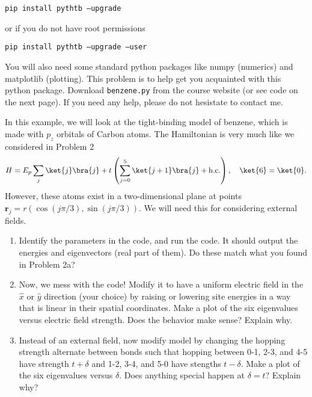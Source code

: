 \documentclass{cthhw}
\begin{document}
\vspace{10pt}
{\tt pip install pythtb --upgrade}
\vspace{10pt}

or if you do not have root permissions

\vspace{10pt}
{\tt pip install pythtb --upgrade --user}
\vspace{10pt}

You will also need some standard python packages like {\sc numpy} (numerics) and {\sc matplotlib} (plotting).
This problem is to help get you acquainted with this python package. Download \texttt{benzene.py} from the course website (or see code on the next page).
If you need any help, please do not hesistate to contact me.

In this example, we will look at the tight-binding model of benzene, which is made with $p_{z}$ orbitals of Carbon atoms. The Hamiltonian is very much like we considered in Problem 2
\begin{equation}
	\label{eq:9}
	H = E_{p} \sum_{j} \ket{j}\bra{j} + t \left(\sum_{j=0}^{5} \ket{j+1} \bra{j} + \mathrm{h.c.}\right), \quad \ket{6} = \ket{0}.
\end{equation}
However, these atoms exist in a two-dimensional plane at points $\mathbf r_{j} = r (\cos(j \pi/3), \sin(j \pi/3)) $. We will need this for considering external fields.

\begin{enumerate}
	\item Identify the parameters in the code, and run the code. It should output the energies and eigenvectors (real part of them). Do these match what you found in Problem 2a?
	\item Now, we mess with the code! Modify it to have a uniform electric field in the $\hat x$ or $\hat y$ direction (your choice) by raising or lowering site energies in a way that is linear in their spatial coordinates. Make a plot of the six eigenvalues versus electric field strength. Does the behavior make sense? Explain why.
	\item Instead of an external field, now modify model by changing the hopping strength alternate between bonds such that hopping between 0-1, 2-3, and 4-5 have strength $t+\delta$ and 1-2, 3-4, and 5-0 have stengths $t-\delta$. Make a plot of the six eigenvalues versus $\delta$. Does anything special happen at $\delta=t$? Explain why?
\end{enumerate}

\newpage
\end{document}
